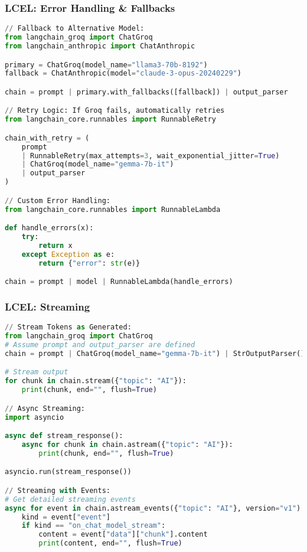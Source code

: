 \begin{frame}[fragile]\frametitle{LCEL: Error Handling \& Fallbacks}

\begin{lstlisting}[language=python, basicstyle=\tiny]
// Fallback to Alternative Model:
from langchain_groq import ChatGroq
from langchain_anthropic import ChatAnthropic

primary = ChatGroq(model_name="llama3-70b-8192")
fallback = ChatAnthropic(model="claude-3-opus-20240229")

chain = prompt | primary.with_fallbacks([fallback]) | output_parser

// Retry Logic: If Groq fails, automatically retries
from langchain_core.runnables import RunnableRetry

chain_with_retry = (
    prompt
    | RunnableRetry(max_attempts=3, wait_exponential_jitter=True)
    | ChatGroq(model_name="gemma-7b-it")
    | output_parser
)

// Custom Error Handling:
from langchain_core.runnables import RunnableLambda

def handle_errors(x):
    try:
        return x
    except Exception as e:
        return {"error": str(e)}

chain = prompt | model | RunnableLambda(handle_errors)
\end{lstlisting}

\end{frame}

\begin{frame}[fragile]\frametitle{LCEL: Streaming}


\begin{lstlisting}[language=python, basicstyle=\tiny]
// Stream Tokens as Generated:
from langchain_groq import ChatGroq
# Assume prompt and output_parser are defined
chain = prompt | ChatGroq(model_name="gemma-7b-it") | StrOutputParser()

# Stream output
for chunk in chain.stream({"topic": "AI"}):
    print(chunk, end="", flush=True)

// Async Streaming:
import asyncio

async def stream_response():
    async for chunk in chain.astream({"topic": "AI"}):
        print(chunk, end="", flush=True)

asyncio.run(stream_response())

// Streaming with Events:
# Get detailed streaming events
async for event in chain.astream_events({"topic": "AI"}, version="v1"):
    kind = event["event"]
    if kind == "on_chat_model_stream":
        content = event["data"]["chunk"].content
        print(content, end="", flush=True)
\end{lstlisting}

\end{frame}


